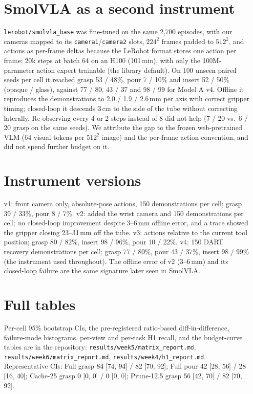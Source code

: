 \documentclass[11pt]{article}
\begin{document}



\appendix

\section{SmolVLA as a second instrument}
\label{app:smolvla}

\texttt{lerobot/smolvla\_base} \citep{shukor2025smolvla,cadene2024lerobot} was fine-tuned on the same 2,700 episodes, with our cameras mapped to its \texttt{camera1}/\texttt{camera2} slots, $224^2$ frames padded to $512^2$, and actions as per-frame deltas because the LeRobot format stores one action per frame; 20k steps at batch 64 on an H100 (101\,min), with only the 100M-parameter action expert trainable (the library default). On 100 unseen paired seeds per cell it reached grasp 53 / 48\%, pour 7 / 10\% and insert 52 / 50\% (opaque / glass), against 77 / 80, 43 / 37 and 98 / 99 for Model A v4. Offline it reproduces the demonstrations to 2.0 / 1.9 / 2.6\,mm per axis with correct gripper timing; closed-loop it descends 3\,cm to the side of the tube without correcting laterally. Re-observing every 4 or 2 steps instead of 8 did not help (7 / 20 vs.\ 6 / 20 grasp on the same seeds). We attribute the gap to the frozen web-pretrained VLM (64 visual tokens per $512^2$ image) and the per-frame action convention, and did not spend further budget on it.

\section{Instrument versions}
\label{app:versions}

v1: front camera only, absolute-pose actions, 150 demonstrations per cell; grasp 39 / 33\%, pour 8 / 7\%. v2: added the wrist camera and 150 demonstrations per cell; no closed-loop improvement despite 3--6\,mm offline error, and a trace showed the gripper closing 23--31\,mm off the tube. v3: actions relative to the current tool position; grasp 80 / 82\%, insert 98 / 96\%, pour 10 / 22\%. v4: 150 DART recovery demonstrations per cell; grasp 77 / 80\%, pour 43 / 37\%, insert 98 / 99\% (the instrument used throughout). The offline error of v2 (3--6\,mm) and its closed-loop failure are the same signature later seen in SmolVLA.

\section{Full tables}
\label{app:tables}

Per-cell 95\% bootstrap CIs, the pre-registered ratio-based diff-in-difference, failure-mode histograms, per-view and per-task H1 recall, and the budget-curve tables are in the repository: \texttt{results/week5/matrix\_report.md}, \texttt{results/week6/matrix\_report.md}, \texttt{results/week4/h1\_report.md}. Representative CIs: Full grasp 84 [74, 94] / 82 [70, 92]; Full pour 42 [28, 56] / 28 [16, 40]; Cache-25 grasp 0 [0, 0] / 0 [0, 0]; Prune-12.5 grasp 56 [42, 70] / 82 [70, 92].
\end{document}
